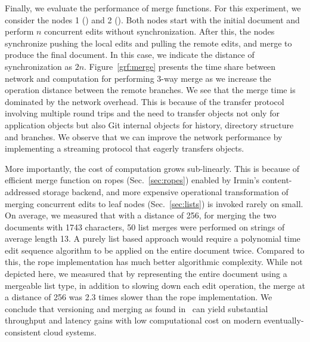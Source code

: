 Finally, we evaluate the performance of merge functions. For this experiment,
we consider the nodes 1 () and 2 (). Both
nodes start with the initial document and perform $n$ concurrent edits without
synchronization. After this, the nodes synchronize pushing the local edits and
pulling the remote edits, and merge to produce the final document. In this
case, we indicate the distance of synchronization as $2n$.
Figure~\ref{grf:merge} presents the time share between network and computation
for performing 3-way merge as we increase the operation distance between the
remote branches. We see that the merge time is dominated by the network
overhead. This is because of the transfer protocol involving multiple round
trips and the need to transfer objects not only for application objects but
also Git internal objects for history, directory structure and branches. We
observe that we can improve the network performance by implementing a streaming
protocol that eagerly transfers objects.

More importantly, the cost of computation grows sub-linearly. This is because
of efficient merge function on ropes (Sec.~\ref{sec:ropes}) enabled by Irmin's
content-addressed storage backend, and more expensive operational
transformation of merging concurrent edits to leaf nodes (Sec.~\ref{sec:lists})
is invoked rarely on small. On average, we measured that with a distance of
256, for merging the two documents with 1743 characters, 50 list merges were
performed on strings of average length 13. A purely list based approach would
require a polynomial time edit sequence algorithm to be applied on the entire
document twice. Compared to this, the rope implementation has much better
algorithmic complexity.  While not depicted here, we measured that by
representing the entire document using a mergeable list type, in addition to
slowing down each edit operation, the merge at a distance of 256 was 2.3 times
slower than the rope implementation.  We conclude that versioning and merging
as found in \name\ can yield substantial throughput and latency gains with low
computational cost on modern eventually-consistent cloud systems.
